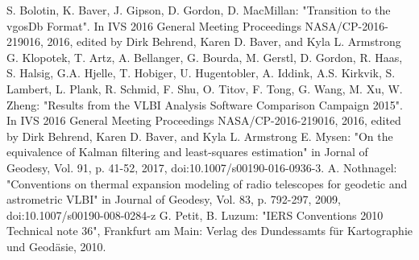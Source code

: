 \documentclass[twocolumn,twoside]{svmultivs_br} %
\begin{document}
\begin{thebibliography}{99}
 S. Bolotin, K. Baver, J. Gipson, D. Gordon, D. MacMillan: "Transition to the vgosDb Format". In IVS 2016 General Meeting Proceedings NASA/CP-2016-219016, 2016, edited by Dirk Behrend, Karen D. Baver, and Kyla L. Armstrong
 G. Klopotek, T. Artz, A. Bellanger, G. Bourda, M. Gerstl, D. Gordon, R. Haas, S. Halsig, G.A. Hjelle, T. Hobiger, U. Hugentobler, A. Iddink, A.S. Kirkvik, S. Lambert, L. Plank,
R. Schmid, F. Shu, O. Titov, F. Tong, G. Wang, M. Xu, W. Zheng: "Results from the VLBI Analysis Software Comparison Campaign 2015". 
In IVS 2016 General Meeting Proceedings NASA/CP-2016-219016, 2016, edited by Dirk Behrend, Karen D. Baver, and Kyla L. Armstrong
 E. Mysen: "On the equivalence of Kalman filtering and least-squares estimation" in Jornal of Geodesy, Vol. 91, p. 41-52, 2017, doi:10.1007/s00190-016-0936-3.
 A. Nothnagel: "Conventions on thermal expansion modeling of radio telescopes for geodetic and astrometric VLBI" in Journal of Geodesy, Vol. 83, p. 792-297, 2009, doi:10.1007/s00190-008-0284-z
 G. Petit, B. Luzum: "IERS Conventions 2010 Technical note 36", Frankfurt am Main: Verlag des Dundessamts für Kartographie und Geodäsie, 2010.

\end{thebibliography}
%
\end{document}
